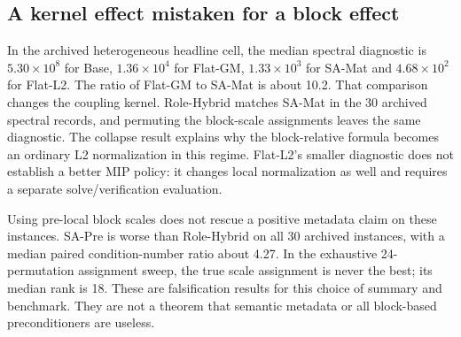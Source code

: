 \documentclass[11pt]{article}
\theoremstyle{definition}
\theoremstyle{remark}
\begin{document}
\subsection{A kernel effect mistaken for a block effect}
In the archived heterogeneous headline cell, the median spectral diagnostic is
$5.30\times10^8$ for Base, $1.36\times10^4$ for Flat-GM,
$1.33\times10^3$ for SA-Mat and $4.68\times10^2$ for Flat-L2.
The ratio of Flat-GM to SA-Mat is about 10.2. That comparison changes the coupling
kernel. Role-Hybrid matches SA-Mat in the 30 archived spectral records, and permuting
the block-scale assignments leaves the same diagnostic. The collapse result explains
why the block-relative formula becomes an ordinary L2 normalization in this regime.
Flat-L2's smaller diagnostic does not establish a better MIP policy: it changes local
normalization as well and requires a separate solve/verification evaluation.

Using pre-local block scales does not rescue a positive metadata claim on these
instances. SA-Pre is worse than Role-Hybrid on all 30 archived instances, with a median
paired condition-number ratio about 4.27. In the exhaustive 24-permutation assignment
sweep, the true scale assignment is never the best; its median rank is 18. These are
falsification results for this choice of summary and benchmark. They are not a theorem
that semantic metadata or all block-based preconditioners are useless.

\end{document}
